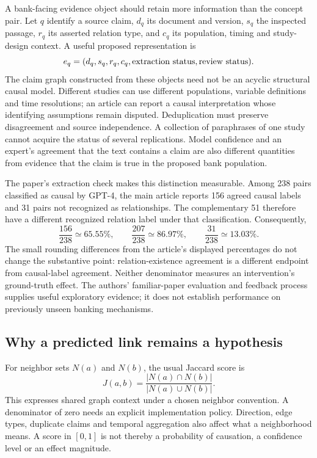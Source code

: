 A bank-facing evidence object should retain more information than the concept pair. Let $q$ identify a source claim, $d_q$ its document and version, $s_q$ the inspected passage, $r_q$ its asserted relation type, and $c_q$ its population, timing and study-design context. A useful proposed representation is
\begin{equation}
  e_q=(d_q,s_q,r_q,c_q,\hbox{extraction status},\hbox{review status}).
  \label{exec20:hypothesis-evidence}
\end{equation}
The claim graph constructed from these objects need not be an acyclic structural causal model. Different studies can use different populations, variable definitions and time resolutions; an article can report a causal interpretation whose identifying assumptions remain disputed. Deduplication must preserve disagreement and source independence. A collection of paraphrases of one study cannot acquire the status of several replications. Model confidence and an expert's agreement that the text contains a claim are also different quantities from evidence that the claim is true in the proposed bank population.

The paper's extraction check makes this distinction measurable. Among 238 pairs classified as causal by GPT-4, the main article reports 156 agreed causal labels and 31 pairs not recognized as relationships. The complementary 51 therefore have a different recognized relation label under that classification. Consequently,
\begin{equation}
 \frac{156}{238}\simeq 65.55\%,\qquad
 \frac{207}{238}\simeq 86.97\%,\qquad
 \frac{31}{238}\simeq 13.03\%.
 \label{exec20:hypothesis-denominators}
\end{equation}
The small rounding differences from the article's displayed percentages do not change the substantive point: relation-existence agreement is a different endpoint from causal-label agreement. Neither denominator measures an intervention's ground-truth effect. The authors' familiar-paper evaluation and feedback process supplies useful exploratory evidence; it does not establish performance on previously unseen banking mechanisms.\citep{exec20_hypothesis_generation,exec20_hypothesis_reference}

\subsection{Why a predicted link remains a hypothesis}
\label{exec20:hypothesis-graph}
For neighbor sets $N(a)$ and $N(b)$, the usual Jaccard score is
\begin{equation}
 J(a,b)=\frac{|N(a)\cap N(b)|}{|N(a)\cup N(b)|}.
 \label{exec20:hypothesis-jaccard}
\end{equation}
This expresses shared graph context under a chosen neighbor convention. A denominator of zero needs an explicit implementation policy. Direction, edge types, duplicate claims and temporal aggregation also affect what a neighborhood means. A score in $[0,1]$ is not thereby a probability of causation, a confidence level or an effect magnitude.

